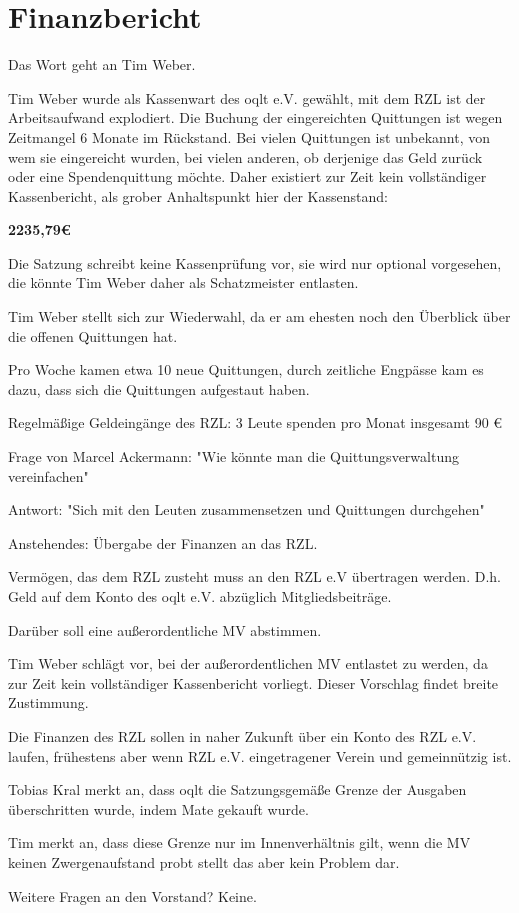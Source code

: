 \documentclass[parskip]{scrartcl}
\begin{document}
\section{Finanzbericht}
{
Das Wort geht an Tim Weber.

Tim Weber wurde als Kassenwart des oqlt e.V. gewählt, mit dem RZL ist der Arbeitsaufwand explodiert.
Die Buchung der eingereichten Quittungen ist wegen Zeitmangel 6 Monate im Rückstand.
Bei vielen Quittungen ist unbekannt, von wem sie eingereicht wurden,
bei vielen anderen, ob derjenige das Geld zurück oder eine Spendenquittung möchte.
Daher existiert zur Zeit kein vollständiger Kassenbericht, als grober Anhaltspunkt hier der Kassenstand:

\textbf{2235,79€}

Die Satzung schreibt keine Kassenprüfung vor, sie wird nur optional vorgesehen,
die \MV könnte Tim Weber daher als Schatzmeister entlasten.

Tim Weber stellt sich zur Wiederwahl, da er am ehesten noch den Überblick über
die offenen Quittungen hat.

Pro Woche kamen etwa 10 neue Quittungen, durch zeitliche Engpässe
kam es dazu, dass sich die Quittungen aufgestaut haben.

Regelmäßige Geldeingänge des RZL:
3 Leute spenden pro Monat insgesamt 90 €

Frage von Marcel Ackermann:
"Wie könnte man die Quittungsverwaltung vereinfachen"

Antwort:
"Sich mit den Leuten zusammensetzen und Quittungen durchgehen"

Anstehendes:
Übergabe der Finanzen an das RZL.

Vermögen, das dem RZL zusteht muss an den RZL e.V übertragen werden.
D.h. Geld auf dem Konto des oqlt e.V. abzüglich Mitgliedsbeiträge.

Darüber soll eine außerordentliche MV abstimmen.

Tim Weber schlägt vor, bei der außerordentlichen MV entlastet zu werden,
da zur Zeit kein vollständiger Kassenbericht vorliegt.
Dieser Vorschlag findet breite Zustimmung.

Die Finanzen des RZL sollen in naher Zukunft über ein Konto des RZL e.V.
laufen, frühestens aber wenn RZL e.V. eingetragener Verein und gemeinnützig ist.

Tobias Kral merkt an, dass oqlt die Satzungsgemäße Grenze der Ausgaben überschritten
wurde, indem Mate gekauft wurde.

Tim merkt an, dass diese Grenze nur im Innenverhältnis gilt,
wenn die MV keinen Zwergenaufstand probt stellt das aber kein Problem dar.

Weitere Fragen an den Vorstand? Keine.

}
\end{document}
